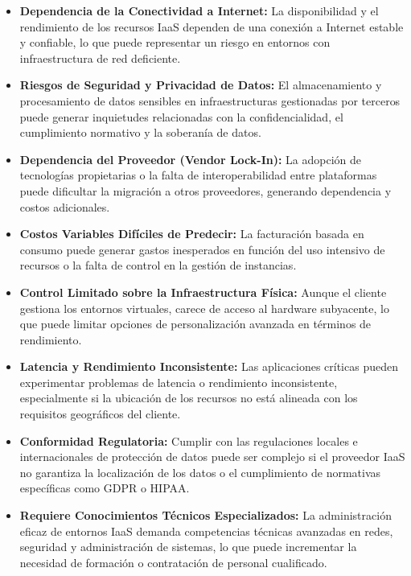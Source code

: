 {                \begin{itemize}
                    \item \textbf{Dependencia de la Conectividad a Internet:} La disponibilidad y el rendimiento de los recursos IaaS dependen de una conexión a Internet estable y confiable, lo que puede representar un riesgo en entornos con infraestructura de red deficiente.
                    \item \textbf{Riesgos de Seguridad y Privacidad de Datos:} El almacenamiento y procesamiento de datos sensibles en infraestructuras gestionadas por terceros puede generar inquietudes relacionadas con la confidencialidad, el cumplimiento normativo y la soberanía de datos.
                    \item \textbf{Dependencia del Proveedor (Vendor Lock-In):} La adopción de tecnologías propietarias o la falta de interoperabilidad entre plataformas puede dificultar la migración a otros proveedores, generando dependencia y costos adicionales.
                    \item \textbf{Costos Variables Difíciles de Predecir:} La facturación basada en consumo puede generar gastos inesperados en función del uso intensivo de recursos o la falta de control en la gestión de instancias.
                    \item \textbf{Control Limitado sobre la Infraestructura Física:} Aunque el cliente gestiona los entornos virtuales, carece de acceso al hardware subyacente, lo que puede limitar opciones de personalización avanzada en términos de rendimiento.
                    \item \textbf{Latencia y Rendimiento Inconsistente:} Las aplicaciones críticas pueden experimentar problemas de latencia o rendimiento inconsistente, especialmente si la ubicación de los recursos no está alineada con los requisitos geográficos del cliente.
                    \item \textbf{Conformidad Regulatoria:} Cumplir con las regulaciones locales e internacionales de protección de datos puede ser complejo si el proveedor IaaS no garantiza la localización de los datos o el cumplimiento de normativas específicas como GDPR o HIPAA.
                    \item \textbf{Requiere Conocimientos Técnicos Especializados:} La administración eficaz de entornos IaaS demanda competencias técnicas avanzadas en redes, seguridad y administración de sistemas, lo que puede incrementar la necesidad de formación o contratación de personal cualificado.
                \end{itemize}
            
}
